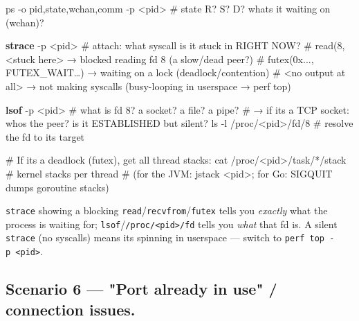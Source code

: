 \documentclass[11pt]{article}
\newenvironment{Shaded}{\begin{snugshade}}{\end{snugshade}}
\newcommand{\AttributeTok}[1]{\textcolor[rgb]{0.16,0.50,0.73}{#1}}
\newcommand{\CommentTok}[1]{\textcolor[rgb]{0.48,0.49,0.49}{#1}}
\newcommand{\ExtensionTok}[1]{\textcolor[rgb]{0.00,0.60,1.00}{\textbf{#1}}}
\newcommand{\FunctionTok}[1]{\textcolor[rgb]{0.56,0.27,0.68}{#1}}
\newcommand{\NormalTok}[1]{\textcolor[rgb]{0.81,0.81,0.76}{#1}}
\newcommand{\OperatorTok}[1]{\textcolor[rgb]{0.81,0.81,0.76}{#1}}
\newcommand{\PreprocessorTok}[1]{\textcolor[rgb]{0.15,0.68,0.38}{#1}}
\begin{document}

\begin{Shaded}
\begin{Highlighting}[]
\FunctionTok{ps} \AttributeTok{{-}o}\NormalTok{ pid,state,wchan,comm }\AttributeTok{{-}p} \OperatorTok{\textless{}}\NormalTok{pid}\OperatorTok{\textgreater{}}    \CommentTok{\# state R? S? D? what\textquotesingle{}s it waiting on (wchan)?}

\ExtensionTok{strace} \AttributeTok{{-}p} \OperatorTok{\textless{}}\NormalTok{pid}\OperatorTok{\textgreater{}}                \CommentTok{\# attach: what syscall is it stuck in RIGHT NOW?}
\CommentTok{\#   read(8,  \textless{}stuck here\textgreater{}      → blocked reading fd 8 (a slow/dead peer?)}
\CommentTok{\#   futex(0x..., FUTEX\_WAIT…)  → waiting on a lock (deadlock/contention)}
\CommentTok{\#   \textless{}no output at all\textgreater{}         → not making syscalls (busy{-}looping in userspace → perf top)}

\ExtensionTok{lsof} \AttributeTok{{-}p} \OperatorTok{\textless{}}\NormalTok{pid}\OperatorTok{\textgreater{}}                  \CommentTok{\# what is fd 8? a socket? a file? a pipe?}
\CommentTok{\#   → if it\textquotesingle{}s a TCP socket: who\textquotesingle{}s the peer? is it ESTABLISHED but silent?}
\FunctionTok{ls} \AttributeTok{{-}l}\NormalTok{ /proc/}\OperatorTok{\textless{}}\NormalTok{pid}\OperatorTok{\textgreater{}}\NormalTok{/fd/8         }\CommentTok{\# resolve the fd to its target}

\CommentTok{\# If it\textquotesingle{}s a deadlock (futex), get all thread stacks:}
\FunctionTok{cat}\NormalTok{ /proc/}\OperatorTok{\textless{}}\NormalTok{pid}\OperatorTok{\textgreater{}}\NormalTok{/task/}\PreprocessorTok{*}\NormalTok{/stack   }\CommentTok{\# kernel stacks per thread}
\CommentTok{\# (for the JVM: jstack \textless{}pid\textgreater{}; for Go: SIGQUIT dumps goroutine stacks)}
\end{Highlighting}
\end{Shaded}

\texttt{strace} showing a blocking \texttt{read}/\texttt{recvfrom}/\texttt{futex} tells you \emph{exactly} what the process is waiting for; \texttt{lsof}/\texttt{/proc/\textless{}pid\textgreater{}/fd} tells you \emph{what} that fd is. A silent \texttt{strace} (no syscalls) means it\textquotesingle s spinning in userspace --- switch to \texttt{perf\ top\ -p\ \textless{}pid\textgreater{}}.

\subsection{Scenario 6 --- "Port already in use" / connection issues.}\label{scenario-6--port-already-in-use--connection-issues}
\end{document}
